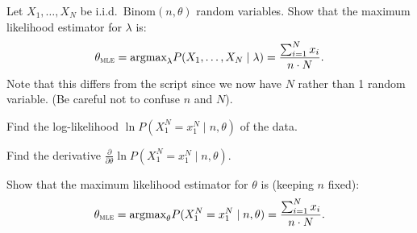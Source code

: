 \documentclass[a4paper,10pt,landscape,twocolumn]{scrartcl}
\begin{document}
\begin{exercise}
	Let $X_1, \dots, X_N$ be i.i.d.\ $\text{Binom}(n, \theta)$ random variables. 
	Show that the maximum likelihood estimator for $\lambda$ is:
	\[
		\theta_\textsc{mle} = \text{argmax}_\lambda P(X_1, \dots, X_N \mid \lambda) = \frac{\sum_{i=1}^N x_i}{n \cdot N}.
	\] 
	Note that this differs from the script since we now have $N$ rather than 1 random variable. 
	(Be careful not to confuse $n$ and $N$).
	
	\begin{subex}
	Find the log-likelihood $\ln P(X_1^N=x_1^N \mid n, \theta)$ of the data.
	\end{subex}
	
	\begin{subex}
		Find the derivative $\frac{\partial}{\partial \theta} \ln P(X_1^N=x_1^N \mid n, \theta)$.
	\end{subex}
	
	\begin{subex}
		Show that the maximum likelihood estimator for $\theta$ is (keeping $n$ fixed):
		\[
			\theta_\textsc{mle} = \text{argmax}_\theta P(X_1^N=x_1^N \mid n, \theta) = \frac{\sum_{i=1}^N x_i}{n \cdot N}.
		\] 
	\end{subex}
	
\end{exercise}

\vfill
{}
\end{document}
